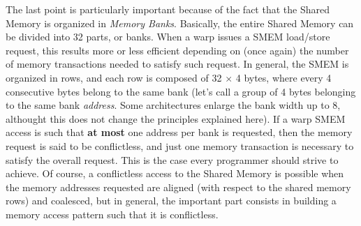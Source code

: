 \documentclass[12pt]{extarticle}
\begin{document}
The last point is particularly important because of the fact that the Shared Memory is organized in \emph{Memory Banks}. Basically, the entire Shared Memory can be divided into 32 parts, or banks. When a warp issues a SMEM load/store request, this results more or less efficient depending on (once again) the number of memory transactions needed to satisfy such request. In general, the SMEM is organized in rows, and each row is composed of 32 $\times$ 4 bytes, where every 4 consecutive bytes belong to the same bank (let's call a group of 4 bytes belonging to the same bank \emph{address}. Some architectures enlarge the bank width up to 8, althought this does not change the principles explained here). If a warp SMEM access is such that \textbf{at most} one address per bank is requested, then the memory request is said to be conflictless, and just one memory transaction is necessary to satisfy the overall request. This is the case every programmer should strive to achieve. Of course, a conflictless access to the Shared Memory is possible when the memory addresses requested are aligned (with respect to the shared memory rows) and coalesced, but in general, the important part consists in building a memory access pattern such that it is conflictless.\newline
\end{document}

